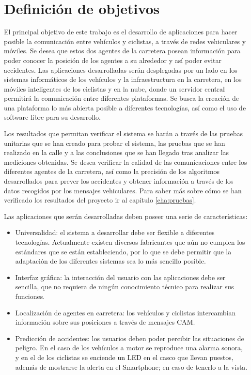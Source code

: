 \chapter{Definición de objetivos}
El principal objetivo de este trabajo es el desarrollo de aplicaciones para hacer posible la comunicación entre vehículos y ciclistas, a través de redes vehiculares y móviles. Se desea que estos dos agentes de la carretera posean información para poder conocer la posición de los agentes a su alrededor y así poder evitar accidentes. Las aplicaciones desarrolladas serán desplegadas por un lado en los sistemas informáticos de los vehículos y la infraestructura en la carretera, en los móviles inteligentes de los ciclistas y en la nube, donde un servidor central permitirá la comunicación entre diferentes plataformas. Se busca la creación de una plataforma lo más abierta posible a diferentes tecnologías, así como el uso de software libre para su desarrollo.

Los resultados que permitan verificar el sistema se harán a través de las pruebas unitarias que se han creado para probar el sistema, las pruebas que se han realizado en la calle y a las conclusiones que se han llegado tras analizar las mediciones obtenidas. Se desea verificar la calidad de las comunicaciones entre los diferentes agentes de la carretera, así como la precisión de los algoritmos desarrollados para prever los accidentes y obtener información a través de los datos recogidos por los mensajes vehiculares. Para saber más sobre cómo se han verificado los resultados del proyecto ir al capítulo \ref{cha:pruebas}.

Las aplicaciones que serán desarrolladas deben poseer una serie de características:
\begin{itemize}
	\item Universalidad: el sistema a desarrollar debe ser flexible a diferentes tecnologías. Actualmente existen diversos fabricantes que aún no cumplen los estándares que se están estableciendo, por lo que se debe permitir que la adaptación de los diferentes sistemas sea lo más sencillo posible.
	\item Interfaz gráfica: la interacción del usuario con las aplicaciones debe ser sencilla, que no requiera de ningún conocimiento técnico para realizar sus funciones.
	\item Localización de agentes en carretera: los vehículos y ciclistas intercambian información sobre sus posiciones a través de mensajes CAM.
	\item Predicción de accidentes: los usuarios deben poder percibir las situaciones de peligro. En el caso de los vehículos a motor se reproduce una alarma sonora, y en el de los ciclistas se enciende un LED en el casco que llevan puestos, además de mostrarse la alerta en el Smartphone; en caso de tenerlo a la vista.
\end{itemize}